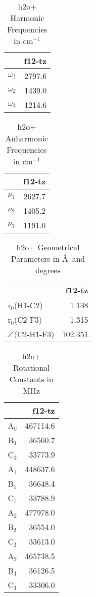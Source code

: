 \begin{table}
\centering
\caption{h2o+ Harmonic Frequencies in cm$^{-1}$}
\label{h2o+_harm}
\begin{tabular}{lr}
\toprule
 & f12-tz \\
\midrule
$\omega_{1}$ & 2797.6 \\
$\omega_{2}$ & 1439.0 \\
$\omega_{3}$ & 1214.6 \\
\bottomrule
\end{tabular}
\end{table}
\begin{table}
\centering
\caption{h2o+ Anharmonic Frequencies in cm$^{-1}$}
\label{h2o+_anharm}
\begin{tabular}{lr}
\toprule
 & f12-tz \\
\midrule
$\nu_{1}$ & 2627.7 \\
$\nu_{2}$ & 1405.2 \\
$\nu_{3}$ & 1191.0 \\
\bottomrule
\end{tabular}
\end{table}
\begin{table}
\centering
\caption{h2o+ Geometrical Parameters in \AA~and degrees}
\label{h2o+_geos}
\begin{tabular}{lr}
\toprule
 & f12-tz \\
\midrule
r$_0$(H1-C2) & 1.138 \\
r$_0$(C2-F3) & 1.315 \\
$\angle$(C2-H1-F3) & 102.351 \\
\bottomrule
\end{tabular}
\end{table}
\begin{table}
\centering
\caption{h2o+ Rotational Constants in MHz}
\label{h2o+_rots}
\begin{tabular}{lr}
\toprule
 & f12-tz \\
\midrule
A$_0$ & 467114.6 \\
B$_0$ & 36560.7 \\
C$_0$ & 33773.9 \\
A$_1$ & 448637.6 \\
B$_1$ & 36648.4 \\
C$_1$ & 33788.9 \\
A$_2$ & 477978.0 \\
B$_2$ & 36554.0 \\
C$_2$ & 33613.0 \\
A$_3$ & 465738.5 \\
B$_3$ & 36126.5 \\
C$_3$ & 33306.0 \\
\bottomrule
\end{tabular}
\end{table}
